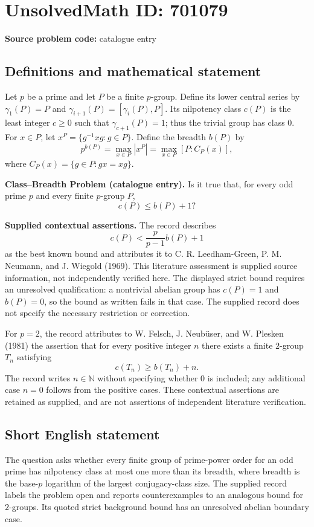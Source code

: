 \documentclass[11pt]{article}
\begin{document}
\section*{UnsolvedMath ID: 701079}
\textbf{Source problem code:} catalogue entry
\subsection{Definitions and mathematical statement}
Let \(p\) be a prime and let \(P\) be a finite \(p\)-group. Define its lower central series by \(\gamma_1(P)=P\) and \(\gamma_{i+1}(P)=[\gamma_i(P),P]\). Its nilpotency class \(c(P)\) is the least integer \(c\geq 0\) such that \(\gamma_{c+1}(P)=1\); thus the trivial group has class \(0\). For \(x\in P\), let \(x^P=\{g^{-1}xg:g\in P\}\). Define the breadth \(b(P)\) by
\[
p^{b(P)}=\max_{x\in P}|x^P|=\max_{x\in P}[P:C_P(x)],
\]
where \(C_P(x)=\{g\in P:gx=xg\}\).

\textbf{Class--Breadth Problem (catalogue entry).} Is it true that, for every odd prime \(p\) and every finite \(p\)-group \(P\),
\[
c(P)\leq b(P)+1?
\]

\textbf{Supplied contextual assertions.} The record describes
\[
c(P)<\frac{p}{p-1}b(P)+1
\]
as the best known bound and attributes it to C. R. Leedham-Green, P. M. Neumann, and J. Wiegold (1969). This literature assessment is supplied source information, not independently verified here. The displayed strict bound requires an unresolved qualification: a nontrivial abelian group has \(c(P)=1\) and \(b(P)=0\), so the bound as written fails in that case. The supplied record does not specify the necessary restriction or correction.

For \(p=2\), the record attributes to W. Felsch, J. Neub\"user, and W. Plesken (1981) the assertion that for every positive integer \(n\) there exists a finite \(2\)-group \(T_n\) satisfying
\[
c(T_n)\geq b(T_n)+n.
\]
The record writes \(n\in\mathbb{N}\) without specifying whether \(0\) is included; any additional case \(n=0\) follows from the positive cases. These contextual assertions are retained as supplied, and are not assertions of independent literature verification.
\subsection{Short English statement}
The question asks whether every finite group of prime-power order for an odd prime has nilpotency class at most one more than its breadth, where breadth is the base-\(p\) logarithm of the largest conjugacy-class size. The supplied record labels the problem open and reports counterexamples to an analogous bound for \(2\)-groups. Its quoted strict background bound has an unresolved abelian boundary case.
\end{document}
